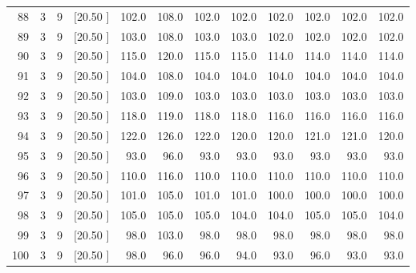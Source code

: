 \documentclass[12pt,a4paper]{article}
\begin{document}
\begin{center}
{\begin{tabular}{r r r r r r r r r r r r}
  88&  3&  9&[20.50     ]&   102.0&   108.0&   102.0&   102.0&   102.0&   102.0&   102.0&   102.0\\[-0.02in]
  89&  3&  9&[20.50     ]&   103.0&   108.0&   103.0&   103.0&   102.0&   102.0&   102.0&   102.0\\[-0.02in]
  90&  3&  9&[20.50     ]&   115.0&   120.0&   115.0&   115.0&   114.0&   114.0&   114.0&   114.0\\[-0.02in]
  91&  3&  9&[20.50     ]&   104.0&   108.0&   104.0&   104.0&   104.0&   104.0&   104.0&   104.0\\[-0.02in]
  92&  3&  9&[20.50     ]&   103.0&   109.0&   103.0&   103.0&   103.0&   103.0&   103.0&   103.0\\[-0.02in]
  93&  3&  9&[20.50     ]&   118.0&   119.0&   118.0&   118.0&   116.0&   116.0&   116.0&   116.0\\[-0.02in]
  94&  3&  9&[20.50     ]&   122.0&   126.0&   122.0&   120.0&   120.0&   121.0&   121.0&   120.0\\[-0.02in]
  95&  3&  9&[20.50     ]&    93.0&    96.0&    93.0&    93.0&    93.0&    93.0&    93.0&    93.0\\[-0.02in]
  96&  3&  9&[20.50     ]&   110.0&   116.0&   110.0&   110.0&   110.0&   110.0&   110.0&   110.0\\[-0.02in]
  97&  3&  9&[20.50     ]&   101.0&   105.0&   101.0&   101.0&   100.0&   100.0&   100.0&   100.0\\[-0.02in]
  98&  3&  9&[20.50     ]&   105.0&   105.0&   105.0&   104.0&   104.0&   105.0&   105.0&   104.0\\[-0.02in]
  99&  3&  9&[20.50     ]&    98.0&   103.0&    98.0&    98.0&    98.0&    98.0&    98.0&    98.0\\[-0.02in]
 100&  3&  9&[20.50     ]&    98.0&    96.0&    96.0&    94.0&    93.0&    96.0&    93.0&    93.0\\[-0.02in]

\hline
\end{tabular}}
\end{center}
\end{document}
